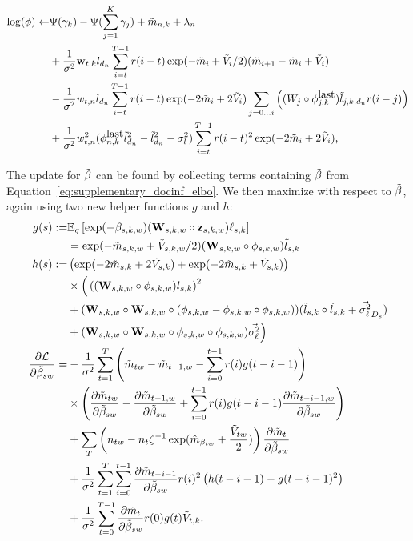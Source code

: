\begin{align}
\log(\phi) \gets & \Psi(\gamma_k) - \Psi(\sum_{j=1}^K \gamma_j) + \tilde{m}_{n,k} + \lambda_n \\ \nonumber
& + \frac{1}{\sigma^2} \textbf{w}_{t,k} l_{d_n} \sum_{i=t}^{T-1} r(i-t) \exp(-\tilde{m}_i + \tilde{V}_i / 2) (\tilde{m}_{i + 1} - \tilde{m}_i + \tilde{V}_i) \\ \nonumber
& - \frac{1}{\sigma^2} w_{t,n} l_{d_n} \sum_{i=t}^{T-1} r(i-t) \exp(-2\tilde{m}_i + 2 \tilde{V}_i) \sum_{j=0\ldots i} \left( (W_{j} \circ \phi_{j,k}^{\mbox{last}}) \tilde{l}_{j,k,d_n} r(i-j) \right) \\ \nonumber
& + \frac{1} {\sigma^2} w_{t,n}^2 (\phi_{n,k}^{\mbox{last}} \tilde{l}_{d_n}^2 - \tilde{l}_{d_n}^2 - \sigma_l^2) \sum_{i=t}^{T-1} r(i-t)^2 \exp(-2\tilde{m}_i + 2 \tilde{V}_i), \nonumber
\end{align}

The update for $\tilde{\beta}$ can be found by collecting terms containing $\tilde{\beta}$
from Equation~\ref{eq:supplementary_docinf_elbo}.  We then maximize with respect to $\tilde{\beta}$, again using two new helper functions $g$ and $h$:
\begin{align*}
%
%
g(s) := & \expectq{\exp(-\beta_{s,k,w} ) ( \W_{s,k,w} \circ \z_{s,k,w} ) \ell_{s,k} } \\ \nonumber
        & = \exp(-\mv_{s,k,w} + \vv_{s,k,w} / 2) ( \W_{s,k,w} \circ \phi_{s,k,w} ) \lv_{s,k} \\ \nonumber
h(s) := & \left( \exp(-2 \mv_{s,k} + 2 \vv_{s,k}) + \exp(-2 \mv_{s,k} + \vv_{s,k}) \right) \\ \nonumber
       & \times \Big( \left( (\W_{s,k,w} \circ \phi_{s,k,w}) l_{s,k} \right)^2 \\ \nonumber
       & + ( \W_{s,k,w} \circ \W_{s,k,w} \circ ( \phi_{s,k,w} - \phi_{s,k,w} \circ \phi_{s,k,w} ) ) (\lv_{s,k} \circ \lv_{s,k} + \vec{\vlv}_{D_{s}}) \notag \\ \nonumber
       & + ( \W_{s,k,w} \circ \W_{s,k,w} \circ \phi_{s,k,w} \circ \phi_{s,k,w} ) \vec{\vlv} \Big)\notag \\ \nonumber
\partl{\mathcal{L}}{\bv_{sw}} =
   & - \frac{1}{\sigma^2} \sum_{t=1}^T
     \left( \mv_{tw} - \mv_{t-1,w} - \sum_{i=0}^{t-1} r(i) g(t-i-1) \right) \\ \nonumber
    &  \times \left( \partl{\mv_{tw}}{\bv_{sw}}
     - \partl{\mv_{t-1,w}}{\bv_{sw}}
     + \sum_{i=0}^{t-1} r(i) g(t-i-1) \partl{\mv_{t-i-1,w}}{\bv_{sw}} \right) \\ \nonumber
   & + \sum_T \left(
       n_{tw} - n_{t} \zeta^{-1}
       \exp( \hat{m}_{\bb_{tw}} + \frac{\tilde{V}_{tw}}{2} ) \right)
       \partl{\mv_t}{\bv_{sw}} \\ \nonumber
   & + \frac{1}{\sigma^2} \sum_{t=1}^T
         \sum_{i=0}^{t-1} \partl{\mv_{t-i-1}}{\bv_{sw}}
         r(i)^2 \left( h(t-i-1) - g(t-i-1)^2 \right) \\ \nonumber
   & + \frac{1}{\sigma^2} \sum_{t=0}^{T-1}
         \partl{\mv_{t}}{\bv_{sw}}
         r(0) g(t) \vv_{t,k}.  \nonumber
\end{align*}

% 

